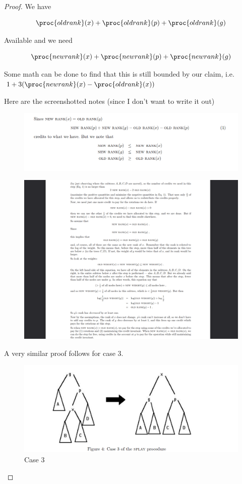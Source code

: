 \documentclass[../notes.tex]{subfiles}
\begin{document}
\begin{proof}
	We have

\begin{equation}
	\proc{old rank}(x) + \proc{old rank}(p) + \proc{old rank}(g)
\end{equation}

Available and we need

\begin{equation}
	\proc{new rank}(x) + \proc{new rank}(p) + \proc{new rank}(g)
\end{equation}


Some math can be done to find that this is still bounded by our claim, i.e. $ 1 + 3(\proc{new rank}(x) - \proc{old rank}(x)) $


Here are the screenshotted notes (since I don't want to write it out)


\begin{figure}[H]
	\centering
	\includegraphics[width=0.8\linewidth]{img/image_2022-11-25-23-39-53.png}
\end{figure}


\begin{figure}[H]
	\centering
	\includegraphics[width=0.8\linewidth]{img/image_2022-11-25-23-40-04.png}
\end{figure}


A very similar proof follows for case 3. 
\begin{figure}[H]
	\centering
	\includegraphics[width=0.8\linewidth]{img/image_2022-11-25-23-40-31.png}
	\caption{Case 3}
\end{figure}


\end{proof}
\end{document}

